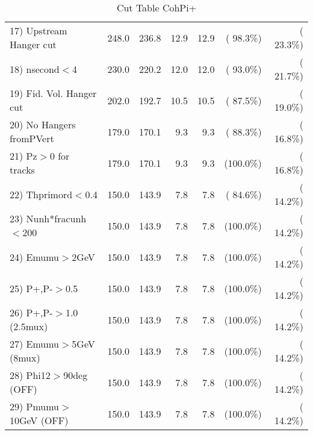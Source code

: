 \begin{table}[h!]
\begin{tabular}{||l||r|r|r|r|r|r||}
 17) Upstream Hanger cut  &        248.0 &        236.8 &         12.9 &         12.9 & ( 98.3\%) & ( 23.3\%) \\
 18) nsecond$<$4          &        230.0 &        220.2 &         12.0 &         12.0 & ( 93.0\%) & ( 21.7\%) \\
 19) Fid. Vol. Hanger cut &        202.0 &        192.7 &         10.5 &         10.5 & ( 87.5\%) & ( 19.0\%) \\
 20) No Hangers fromPVert &        179.0 &        170.1 &          9.3 &          9.3 & ( 88.3\%) & ( 16.8\%) \\
 21) Pz$>$0 for tracks    &        179.0 &        170.1 &          9.3 &          9.3 & (100.0\%) & ( 16.8\%) \\
 22) Thprimord$<$0.4      &        150.0 &        143.9 &          7.8 &          7.8 & ( 84.6\%) & ( 14.2\%) \\
 23) Nunh*fracunh$<$200   &        150.0 &        143.9 &          7.8 &          7.8 & (100.0\%) & ( 14.2\%) \\
 24) Emumu$>$2GeV         &        150.0 &        143.9 &          7.8 &          7.8 & (100.0\%) & ( 14.2\%) \\
 25) P+,P-$>$0.5          &        150.0 &        143.9 &          7.8 &          7.8 & (100.0\%) & ( 14.2\%) \\
 26) P+,P-$>$1.0 (2.5mux) &        150.0 &        143.9 &          7.8 &          7.8 & (100.0\%) & ( 14.2\%) \\
 27) Emumu$>$5GeV  (8mux) &        150.0 &        143.9 &          7.8 &          7.8 & (100.0\%) & ( 14.2\%) \\
 28) Phi12$>$90deg  (OFF) &        150.0 &        143.9 &          7.8 &          7.8 & (100.0\%) & ( 14.2\%) \\
 29) Pmumu$>$10GeV  (OFF) &        150.0 &        143.9 &          7.8 &          7.8 & (100.0\%) & ( 14.2\%) \\
 \hline
 \hline
 \end{tabular}
 \caption{Cut Table  CohPi+   }
 \label{tab-cutcohjpsi-mumu_nuecc}
 \end{table}

